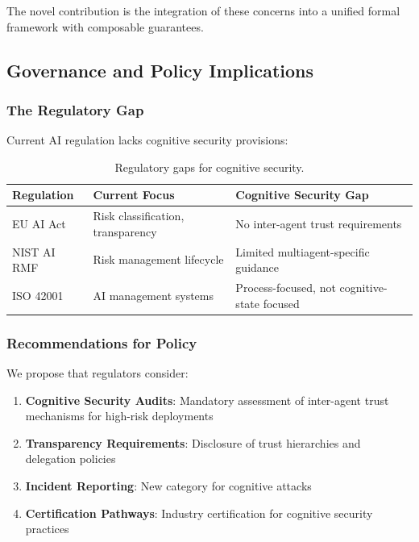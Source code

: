 \documentclass[
]{article}
\begin{document}
The novel contribution is the integration of these concerns into a
unified formal framework with composable guarantees.

\subsection{Governance and Policy Implications}\label{sec:governance}

\subsubsection{The Regulatory Gap}\label{the-regulatory-gap}

Current AI regulation lacks cognitive security provisions:

\begin{table}[htbp]
\centering
\caption{Regulatory gaps for cognitive security.}
\label{tab:regulatory-gaps}
\begin{tabular}{@{}lp{4cm}p{4cm}@{}}
\toprule
Regulation & Current Focus & Cognitive Security Gap \\
\midrule
EU AI Act & Risk classification, transparency & No inter-agent trust requirements \\
NIST AI RMF & Risk management lifecycle & Limited multiagent-specific guidance \\
ISO 42001 & AI management systems & Process-focused, not cognitive-state focused \\
\bottomrule
\end{tabular}
\end{table}

\subsubsection{Recommendations for
Policy}\label{recommendations-for-policy}

We propose that regulators consider:

\begin{enumerate}
\item \textbf{Cognitive Security Audits}: Mandatory assessment of inter-agent trust mechanisms for high-risk deployments
\item \textbf{Transparency Requirements}: Disclosure of trust hierarchies and delegation policies
\item \textbf{Incident Reporting}: New category for cognitive attacks
\item \textbf{Certification Pathways}: Industry certification for cognitive security practices
\end{enumerate}
\end{document}
